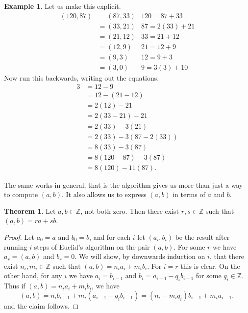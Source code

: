 \documentclass{article}
\newcommand{\Z}{\mathbb{Z}}
\newcommand{\rb}[1]{\left( #1 \right)}
\theoremstyle{definition}\newtheorem{definition}{Definition}
\theoremstyle{definition}\newtheorem{remark}[definition]{Remark}
\theoremstyle{definition}\newtheorem*{example}{Example}
\theoremstyle{definition}\newtheorem*{note}{Note}
\newtheorem{theorem}[definition]{Theorem}
\begin{document}
\begin{example}
Let us make this explicit.
\begin{align*}
\rb{120, 87}
& = \rb{87, 33} & 120 = 87 + 33 \\
& = \rb{33, 21} & 87 = 2\rb{33} + 21 \\
& = \rb{21, 12} & 33 = 21 + 12 \\
& = \rb{12, 9} & 21 = 12 + 9 \\
& = \rb{9, 3} & 12 = 9 + 3 \\
& = \rb{3, 0} & 9 = 3\rb{3} + 10
\end{align*}
Now run this backwards, writing out the equations.
\begin{align*}
3
& = 12 - 9 \\
& = 12 - \rb{21 - 12} \\
& = 2\rb{12} - 21 \\
& = 2\rb{33 - 21} - 21 \\
& = 2\rb{33} - 3\rb{21} \\
& = 2\rb{33} - 3\rb{87 - 2\rb{33}} \\
& = 8\rb{33} - 3\rb{87} \\
& = 8\rb{120 - 87} - 3\rb{87} \\
& = 8\rb{120} - 11\rb{87}.
\end{align*}
\end{example}

The same works in general, that is the algorithm gives us more than just a way to compute $ \rb{a, b} $. It also allows us to express $ \rb{a, b} $ in terms of $ a $ and $ b $.

\begin{theorem}
\label{thm:6}
Let $ a, b \in \Z $, not both zero. Then there exist $ r, s \in \Z $ such that $ \rb{a, b} = ra + sb $.
\end{theorem}

\begin{proof}
Let $ a_0 = a $ and $ b_0 = b $, and for each $ i $ let $ \rb{a_i, b_i} $ be the result after running $ i $ steps of Euclid's algorithm on the pair $ \rb{a, b} $. For some $ r $ we have $ a_r = \rb{a, b} $ and $ b_r = 0 $. We will show, by downwards induction on $ i $, that there exist $ n_i, m_i \in \Z $ such that $ \rb{a, b} = n_ia_i + m_ib_i $. For $ i = r $ this is clear. On the other hand, for any $ i $ we have $ a_i = b_{i - 1} $ and $ b_i = a_{i - 1} - q_ib_{i - 1} $ for some $ q_i \in \Z $. Thus if $ \rb{a, b} = n_ia_i + m_ib_i $, we have
$$ \rb{a, b} = n_ib_{i - 1} + m_i\rb{a_{i - 1} - q_ib_{i - 1}} = \rb{n_i - m_iq_i}b_{i - 1} + m_ia_{i - 1}, $$
and the claim follows.
\end{proof}
\end{document}
